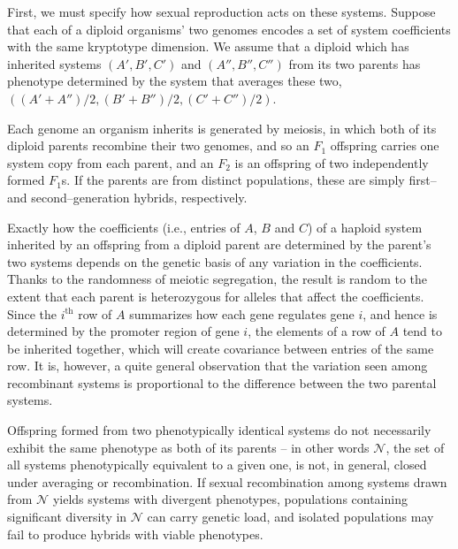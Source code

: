 \documentclass{article}
\newcommand{\1}{\mathbbm{1}}
\newcommand{\allS}{\mathcal{N}}
\begin{document}
First, we must specify how sexual reproduction acts on these systems.
Suppose that each of a diploid organisms' two genomes encodes a set of system coefficients
with the same kryptotype dimension. 
We assume that a diploid which has inherited systems $(A', B', C')$ and $(A'', B'', C'')$ from its two parents
has phenotype determined by the system that averages these two,
$((A'+A'')/2, (B'+B'')/2, (C'+C'')/2)$.

Each genome an organism inherits is generated by meiosis,
in which both of its diploid parents recombine their two genomes,
and so an $F_1$ offspring carries one system copy from each parent,
and an $F_2$ is an offspring of two independently formed $F_1$s.
If the parents are from distinct populations,
these are simply first-- and second--generation hybrids, respectively.

Exactly how the coefficients 
(i.e., entries of $A$, $B$ and $C$)
of a haploid system inherited by an offspring from a diploid parent
are determined by the parent's two systems
depends on the genetic basis of any variation in the coefficients.
Thanks to the randomness of meiotic segregation,
the result is random to the extent that each parent is heterozygous
for alleles that affect the coefficients.
Since the $i^\text{th}$ row of $A$ summarizes how each gene regulates gene $i$,
and hence is determined by the promoter region of gene $i$,
the elements of a row of $A$ tend to be inherited together,
which will create covariance between entries of the same row.
It is, however, a quite general observation that the variation seen among recombinant systems
is proportional to the difference between the two parental systems.

Offspring formed from two phenotypically identical systems do not necessarily exhibit the same phenotype as both of its parents 
-- in other words $\allS$, the set of all systems phenotypically equivalent to a given one, is not, in general, closed under averaging or recombination.
If sexual recombination among systems drawn from $\allS$ yields systems with divergent phenotypes, 
populations containing significant diversity in $\allS$ can carry genetic load, and isolated populations may fail to produce hybrids with viable phenotypes.
\end{document}
